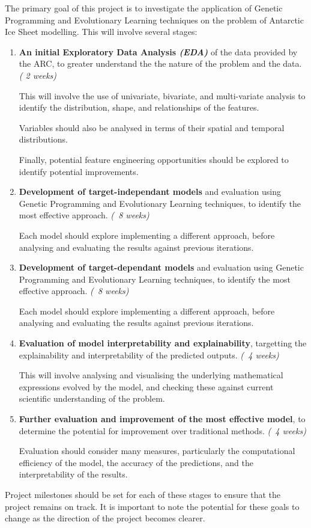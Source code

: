 \documentclass[11pt, a4paper, twoside, openright]{report}
\begin{document}
The primary goal of this project is to investigate the
application of Genetic Programming and Evolutionary Learning
techniques on the problem of Antarctic Ice Sheet modelling.
This will involve several stages:
\begin{enumerate}
\item \textbf{An initial Exploratory Data Analysis \textit{(EDA)}} of
  the data provided by the ARC, to greater understand the
  the nature of the problem and the data. \textit{( 2 weeks)}
  
  This will involve the use of univariate, bivariate, 
  and multi-variate analysis to identify the distribution,
  shape, and relationships of the features.

  Variables should also be analysed in terms of their 
  spatial and temporal distributions.
  
  Finally, potential feature engineering opportunities
  should be explored to identify potential improvements.
\item \textbf{Development of target-independant models} and evaluation
  using Genetic Programming and Evolutionary Learning
  techniques, to identify the most effective approach.
  \textit{(~8 weeks)}

  Each model should explore implementing a different
  approach, before analysing and evaluating the results
  against previous iterations.
\item \textbf{Development of target-dependant models} and evaluation
  using Genetic Programming and Evolutionary Learning
  techniques, to identify the most effective approach.
  \textit{(~8 weeks)}

  Each model should explore implementing a different
  approach, before analysing and evaluating the results
  against previous iterations.
\item \textbf{Evaluation of model interpretability and explainability},
  targetting the explainability and interpretability of
  the predicted outputs. \textit{(~4 weeks)}

  This will involve analysing and visualising the
  underlying mathematical expressions evolved by the model,
  and checking these against current scientific
  understanding of the problem.
\item \textbf{Further evaluation and improvement of the most effective model}, to
  determine the potential for improvement over traditional
  methods. \textit{(~4 weeks)}

  Evaluation should consider many measures, particularly the
  computational efficiency of the model, the accuracy of the
  predictions, and the interpretability of the results.
\end{enumerate}
Project milestones should be set for each of these stages
to ensure that the project remains on track. It is important
to note the potential for these goals to change as the 
direction of the project becomes clearer.
\end{document}
